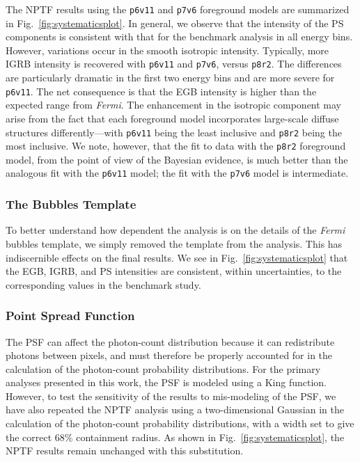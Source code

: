 The NPTF results using the \texttt{p6v11} and \texttt{p7v6} foreground models are summarized in Fig.~\ref{fig:systematicsplot}.%
In general, we observe that the intensity of the PS components is consistent with that for the benchmark analysis in all energy bins.  However, variations occur in the smooth isotropic intensity.  Typically, more IGRB intensity is recovered with \texttt{p6v11} and \texttt{p7v6}, versus \texttt{p8r2}.  The differences are particularly dramatic in the first two energy bins and are more severe for \texttt{p6v11}.  The net consequence is that the EGB intensity is higher than the expected range from \emph{Fermi}.  The enhancement in the isotropic component may arise from the fact that each foreground model incorporates large-scale diffuse structures differently---with \texttt{p6v11} being the least inclusive and \texttt{p8r2} being the most inclusive.  We note, however, that the fit to data with the \texttt{p8r2} foreground model, from the point of view of the Bayesian evidence, is much better than the analogous fit with the  \texttt{p6v11} model; the fit with the \texttt{p7v6} model is intermediate. 

\subsubsection{The Bubbles Template}

To better understand how dependent the analysis is on the details of the \emph{Fermi} bubbles template, we simply removed the template from the analysis.  This has indiscernible effects on the final results.  We see in Fig.~\ref{fig:systematicsplot} that the EGB, IGRB, and PS intensities are consistent, within uncertainties, to the corresponding values in the benchmark study.  %

\subsubsection{Point Spread Function}

The PSF can affect the photon-count distribution because it can redistribute photons between pixels, and must therefore be properly accounted for in the calculation of the photon-count probability distributions.  For the primary analyses presented in this work, the PSF is modeled using a King function.  However, to test the sensitivity of the results to mis-modeling of the PSF, we have also repeated the NPTF analysis using a two-dimensional Gaussian in the calculation of the photon-count probability distributions, with a width set to give the correct 68\% containment radius.  As shown in Fig.~\ref{fig:systematicsplot}, the NPTF results remain unchanged with this substitution.  %

